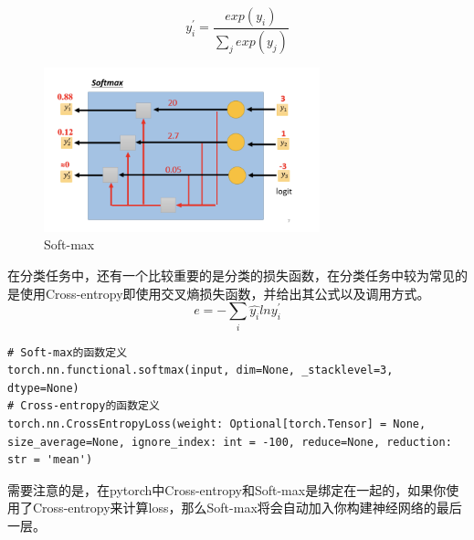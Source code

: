 \documentclass{article}
\begin{document}
\begin{equation}
    y^{\prime }_{i}  = \frac{exp(y_{i})}{\sum_{j} exp(y_{j})}
\end{equation}
\begin{figure}[H]
    \centering
    \includegraphics[width=8cm]{picture/softmax.png}
    \caption{Soft-max}
    \label{fig:galxy}
\end{figure}
\indent 在分类任务中，还有一个比较重要的是分类的损失函数，在分类任务中较为常见的是使用Cross-entropy即使用交叉熵损失函数，并给出其公式以及调用方式。
\begin{equation}
    e = - \sum_{i} \hat{y_{i}} ln y^{\prime}_i
\end{equation}

\begin{lstlisting}
# Soft-max的函数定义
torch.nn.functional.softmax(input, dim=None, _stacklevel=3, dtype=None)
# Cross-entropy的函数定义
torch.nn.CrossEntropyLoss(weight: Optional[torch.Tensor] = None, size_average=None, ignore_index: int = -100, reduce=None, reduction: str = 'mean')
\end{lstlisting}

\indent 需要注意的是，在pytorch中Cross-entropy和Soft-max是绑定在一起的，如果你使用了Cross-entropy来计算loss，那么Soft-max将会自动加入你构建神经网络的最后一层。\par
\newpage
\end{document}
